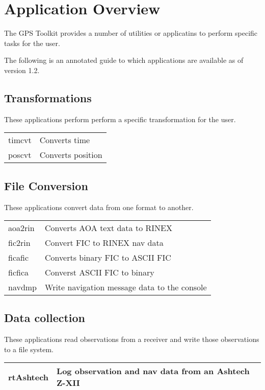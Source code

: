 \chapter{Application Overview}

The GPS Toolkit provides a number of utilities or applicatins to perform specific tasks for the user.

The following is an annotated guide to which applications are available as of version 1.2.

\section{Transformations}

These applications perform perform a specific transformation for the user.

\begin{center}
\begin{tabular} {|ll|} \hline
timcvt & Converts time \\
poscvt & Converts position \\ \hline
\end{tabular}
\end{center}

\section{File Conversion}
These applications convert data from one format to another.

\begin{center}
\begin{tabular} {|ll|} \hline
aoa2rin & Converts AOA text data to RINEX \\
fic2rin & Convert FIC to RINEX nav data \\
ficafic & Converts binary FIC to ASCII FIC \\
ficfica & Converst ASCII FIC to binary \\
navdmp & Write navigation message data to the console \\  \hline
\end{tabular}
\end{center}

\section{Data collection}
These applications read observations from a receiver and write those
observations to a file system.

\begin{center}
\begin{tabular} {|ll|} \hline
rtAshtech & Log observation and nav data from an Ashtech Z-XII \\ \hline
\end{tabular}
\end{center}

